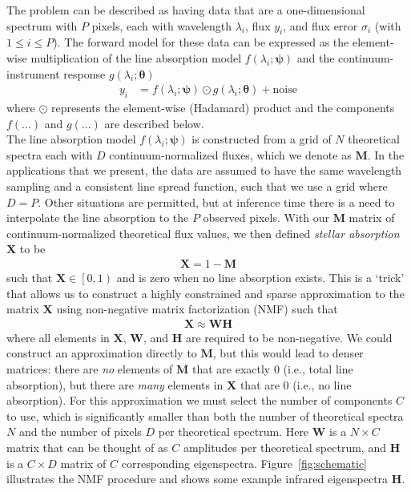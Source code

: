 \documentclass[modern]{aastex631}
\renewcommand{\vec}[1]{\mathbf{#1}}
\newcommand{\vectheta}{\boldsymbol{\theta}}
\newcommand{\vecpsi}{\boldsymbol{\psi}}
\newcommand{\vecX}{\mathbf{X}}
\newcommand{\hadamard}{\odot}
\begin{document}
The problem can be described as having data that are a one-dimensional spectrum with $P$ pixels, each with wavelength $\lambda_i$, flux $y_i$, and flux error $\sigma_i$ (with $1 \leq i \leq P$). The forward model for these data can be expressed as the element-wise multiplication of the line absorption model $f(\lambda_i; \vecpsi)$ and the continuum-instrument response $g(\lambda_i;\vectheta)$
\begin{align}
    y_i &= f(\lambda_i;\vecpsi)\hadamard{}g(\lambda_i;\vectheta) + \mbox{noise}
\end{align}
where $\hadamard$ represents the element-wise (Hadamard) product and the components $f(...)$ and $g(...)$ are described below.\\


The line absorption model $f(\lambda_i;\vecpsi)$ is constructed from a grid of $N$ theoretical spectra each with $D$  continuum-normalized fluxes, which we denote as $\vec{M}$. In the applications that we present, the data are assumed to have the same wavelength sampling and a consistent line spread function, such that we use a grid where $D = P$. Other situations are permitted, but at inference time there is a need to interpolate the line absorption to the $P$ observed pixels. With our $\vec{M}$ matrix of continuum-normalized theoretical flux values, we then defined \emph{stellar absorption} $\vecX$ to be
\begin{align}
    \vecX = 1 - \vec{M}
\end{align}
such that $\vecX \in \left[0, 1\right)$ and is zero when no line absorption exists. This is a `trick' that allows us to construct a highly constrained and sparse approximation to the matrix $\vecX$ using non-negative matrix factorization (NMF) such that 
\begin{align}
    \vecX \approx \vec{W}\vec{H} \label{eq:nmf}
\end{align}
where all elements in $\vecX$, $\vec{W}$, and $\vec{H}$ are required to be non-negative. 
We could construct an approximation directly to $\vec{M}$, but this would lead to denser matrices: there are \emph{no} elements of $\vec{M}$ that are exactly 0 (i.e., total line absorption), but there are \emph{many} elements in $\vecX$ that are 0 (i.e., no line absorption). For this approximation we must select the number of components $C$ to use, which is significantly smaller than both the number of theoretical spectra $N$ and the number of pixels $D$ per theoretical spectrum. Here $\vec{W}$ is a $N \times C$ matrix that can be thought of as $C$ amplitudes per theoretical spectrum, and $\vec{H}$ is a $C \times D$ matrix of $C$ corresponding eigenspectra. Figure~\ref{fig:schematic} illustrates the NMF procedure and shows some example infrared eigenspectra $\vec{H}$. \\
\end{document}
